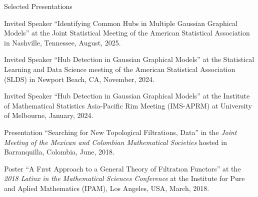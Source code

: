 \documentclass{resume_customized} %
\begin{document}
\begin{rSection}{Selected Presentations}
	\vspace{-1em}
	\begin{rSubsection}{}{}{}{}
		\item Invited Speaker ``Identifying Common Hubs in Multiple Gaussian Graphical Models'' at the Joint Statistical Meeting of the American Statistical Association in Nashville, Tennessee, August, 2025.
		\item Invited Speaker ``Hub Detection in Gaussian Graphical Models'' at the Statistical Learning and Data Science meeting of the American Statistical Association (SLDS) in Newport Beach, CA, November, 2024.
		\item Invited Speaker ``Hub Detection in Gaussian Graphical Models'' at the Institute of Mathematical Statistics Asia-Pacific Rim Meeting (IMS-APRM) at University of Melbourne, January, 2024.
		\item Presentation ``Searching for New Topological Filtrations, Data'' in the {\it Joint Meeting of the Mexican and Colombian Mathematical Societies} hosted in Barranquilla, Colombia, June, 2018.
		\item Poster ``A Fırst Approach to a General Theory of Fıltratıon Functors'' at the {\it 2018 Latinx in the Mathematical Sciences Conference} at the Institute for Pure and Aplied Mathematics (IPAM), Los Angeles, USA, March, 2018.
	\end{rSubsection}


\end{rSection}
\end{document}
